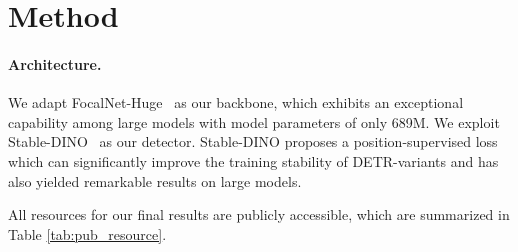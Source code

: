 \documentclass{article}
\begin{document}
 \section{Method}

\paragraph{Architecture.} We adapt FocalNet-Huge~\cite{yang2022focal} as our backbone, which exhibits an exceptional capability among large models with model parameters of only 689M. We exploit Stable-DINO~\cite{liu2023detection} as our detector. Stable-DINO proposes a {position-supervised loss} which can significantly improve the training stability of DETR-variants and has also yielded remarkable results on large models.

All resources for our final results are publicly accessible, which are summarized in Table \ref{tab:pub_resource}.

\begin{table*}[ht]
\centering\setlength{\tabcolsep}{7pt}
\renewcommand{\arraystretch}{1.5}
\vspace{-0mm}
\end{table*}
\end{document}
